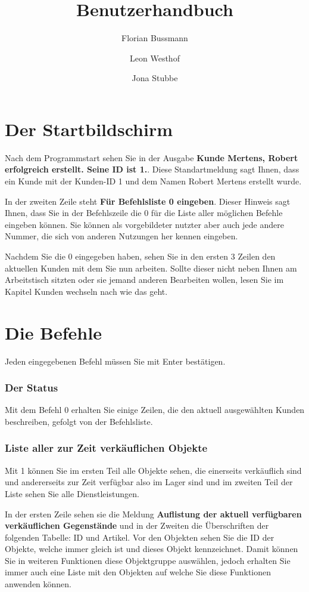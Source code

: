 ﻿\documentclass[a4paper,12pt,titlepage]{article}
\title{Benutzerhandbuch}
\author{Florian Bussmann \and Leon Westhof \and Jona Stubbe}
\newcommand\enquote[1]{{\ttfamily \bfseries #1}}
\begin{document}
\maketitle
\tableofcontents

\part{Der Startbildschirm}
Nach dem Programmstart sehen Sie in der Ausgabe \enquote{Kunde Mertens, Robert erfolgreich erstellt. Seine ID ist 1.}.
Diese Standartmeldung sagt Ihnen, dass ein Kunde mit der Kunden-ID 1 und dem Namen Robert Mertens erstellt wurde.

In der zweiten Zeile steht \enquote{Für Befehlsliste 0 eingeben}.
Dieser Hinweis sagt Ihnen, dass Sie in der Befehlszeile die 0 für die Liste aller möglichen Befehle eingeben können.
Sie können als vorgebildeter nutzter aber auch jede andere Nummer, die sich von anderen Nutzungen her kennen eingeben.

Nachdem Sie die 0 eingegeben haben, sehen Sie in den ersten 3 Zeilen den aktuellen Kunden mit dem Sie nun arbeiten.
Sollte dieser nicht neben Ihnen am Arbeitstisch sitzten oder sie jemand anderen Bearbeiten wollen, lesen Sie im Kapitel Kunden wechseln nach wie das geht.

\part{Die Befehle}
Jeden eingegebenen Befehl müssen Sie mit Enter bestätigen.

\section{Der Status}
Mit dem Befehl 0 erhalten Sie einige Zeilen, die den aktuell ausgewählten Kunden beschreiben,
gefolgt von der Befehlsliste.

\section{Liste aller zur Zeit verkäuflichen Objekte}
Mit 1 können Sie im ersten Teil alle Objekte sehen,
 die einerseits verkäuflich sind und andererseits zur Zeit verfügbar also im Lager sind und im zweiten Teil der Liste sehen Sie alle Dienstleistungen.

In der ersten Zeile sehen sie die Meldung \enquote{Auflistung der aktuell verfügbaren verkäuflichen Gegenstände}
 und in der Zweiten die Überschriften der folgenden Tabelle: ID und Artikel.
Vor den Objekten sehen Sie die ID der Objekte, welche immer gleich ist
 und dieses Objekt kennzeichnet.
Damit können Sie in weiteren Funktionen diese Objektgruppe auswählen,
 jedoch erhalten Sie immer auch eine Liste mit den Objekten auf welche Sie diese Funktionen anwenden können.
\end{document}
